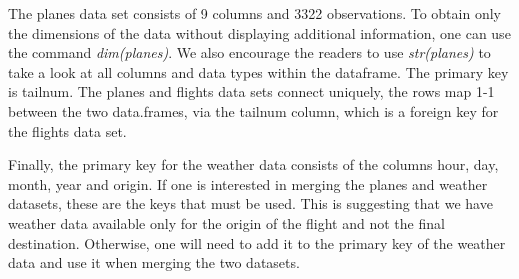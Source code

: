 The planes data set consists of 9 columns and 3322 observations. To obtain only the dimensions of the data without displaying additional information, one can use the command \textit{dim(planes)}. We also encourage the readers to use \textit{str(planes)} to take a look at all columns and data types within the dataframe. The primary key is tailnum. The planes and flights data sets connect uniquely, the rows map 1-1 between the two data.frames, via the tailnum column, which is a foreign key for the flights data set.

Finally, the primary key for the weather data consists of the columns hour, day, month, year and origin. If one is interested in merging the planes and weather datasets, these are the keys that must be used. This is suggesting that we have weather data available only for the origin of the flight and not the final destination. Otherwise, one will need to add it to the primary key of the weather data and use it when merging the two datasets.

